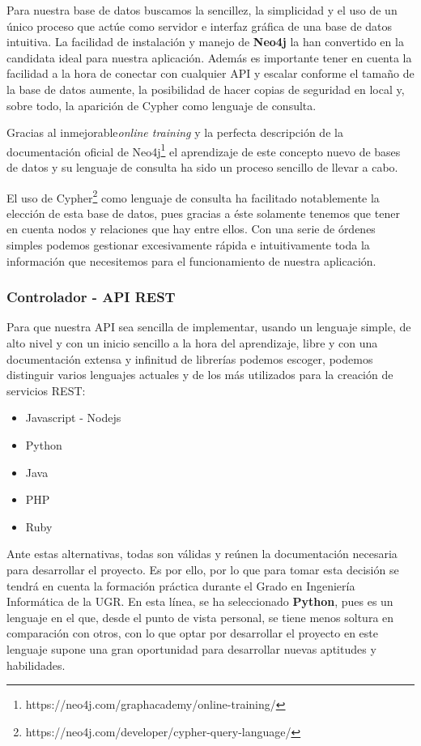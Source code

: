 Para nuestra base de datos buscamos la sencillez, la simplicidad y el uso de un único proceso que actúe como servidor e interfaz gráfica de una base de datos intuitiva. La facilidad de instalación y manejo de \textbf{Neo4j} la han convertido en la candidata ideal para nuestra aplicación.  Además es importante tener en cuenta la facilidad a la hora de conectar con cualquier API y escalar conforme el tamaño de la base de datos aumente, la posibilidad de hacer copias de seguridad en local y, sobre todo, la aparición de Cypher como lenguaje de consulta\cite{neovstitan}.

Gracias al inmejorable\textit{online training} y la perfecta descripción de la documentación oficial de Neo4j\footnote{https://neo4j.com/graphacademy/online-training/} el aprendizaje de este concepto nuevo de bases de datos y su lenguaje de consulta ha sido un proceso sencillo de llevar a cabo.

El uso de Cypher\footnote{https://neo4j.com/developer/cypher-query-language/} como lenguaje de consulta ha facilitado notablemente la elección de esta base de datos, pues gracias a éste solamente tenemos que tener en cuenta nodos y relaciones que hay entre ellos. Con una serie de órdenes simples podemos gestionar excesivamente rápida e intuitivamente toda la información que necesitemos para el funcionamiento de nuestra aplicación.

\subsubsection{Controlador - API REST}

Para que nuestra API sea sencilla de implementar, usando un lenguaje simple, de alto nivel y con un inicio sencillo a la hora del aprendizaje, libre y con una documentación extensa y infinitud de librerías podemos escoger, podemos distinguir varios lenguajes actuales y de los más utilizados para la creación de servicios REST\cite{apirest1}\cite{apirest2}\cite{apirest3}:

\begin{itemize}
    \item Javascript - Nodejs
    \item Python
    \item Java 
    \item PHP
    \item Ruby
\end{itemize}

Ante estas alternativas, todas son válidas y reúnen la documentación necesaria para desarrollar el proyecto. Es por ello, por lo que para tomar esta decisión se tendrá en cuenta la formación  práctica durante el Grado en Ingeniería Informática de la UGR. En esta línea, se ha seleccionado \textbf{Python}, pues es un lenguaje en el que, desde el punto de vista personal, se tiene menos soltura en comparación con otros, con lo que optar por desarrollar el proyecto en este lenguaje supone una gran oportunidad para desarrollar nuevas aptitudes y habilidades.

